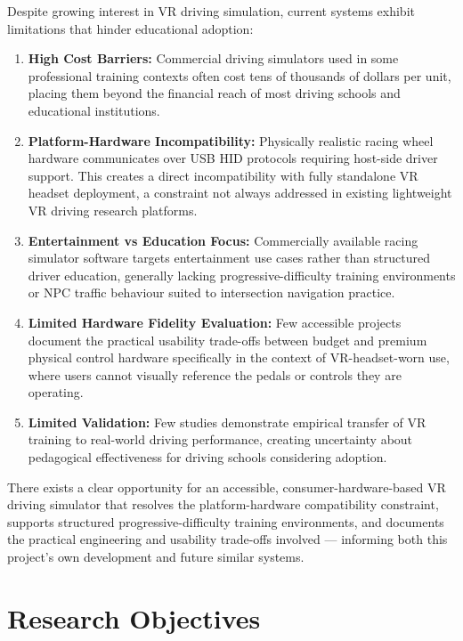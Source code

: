 Despite growing interest in VR driving simulation, current systems exhibit limitations that hinder educational adoption:

\begin{enumerate}
    \item \textbf{High Cost Barriers:} Commercial driving simulators used in some professional training contexts often cost tens of thousands of dollars per unit, placing them beyond the financial reach of most driving schools and educational institutions.
    
    \item \textbf{Platform-Hardware Incompatibility:} Physically realistic racing wheel hardware communicates over USB HID protocols requiring host-side driver support. This creates a direct incompatibility with fully standalone VR headset deployment, a constraint not always addressed in existing lightweight VR driving research platforms.
    
    \item \textbf{Entertainment vs Education Focus:} Commercially available racing simulator software targets entertainment use cases rather than structured driver education, generally lacking progressive-difficulty training environments or NPC traffic behaviour suited to intersection navigation practice.
    
    \item \textbf{Limited Hardware Fidelity Evaluation:} Few accessible projects document the practical usability trade-offs between budget and premium physical control hardware specifically in the context of VR-headset-worn use, where users cannot visually reference the pedals or controls they are operating.
    
    \item \textbf{Limited Validation:} Few studies demonstrate empirical transfer of VR training to real-world driving performance, creating uncertainty about pedagogical effectiveness for driving schools considering adoption.
\end{enumerate}

There exists a clear opportunity for an accessible, consumer-hardware-based VR driving simulator that resolves the platform-hardware compatibility constraint, supports structured progressive-difficulty training environments, and documents the practical engineering and usability trade-offs involved — informing both this project's own development and future similar systems.

\section{Research Objectives}

